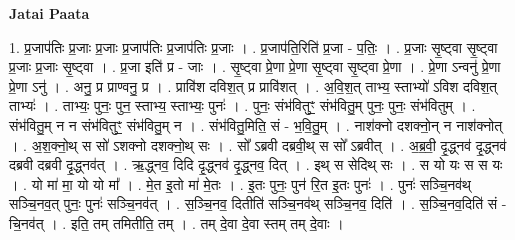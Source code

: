 \documentclass[17pt]{extarticle}
\begin{document}
\textbf{Jatai Paata} \newline

1. प्र॒जाप॑तिः प्र॒जाः प्र॒जाः प्र॒जाप॑तिः प्र॒जाप॑तिः प्र॒जाः । . प्र॒जाप॑ति॒रिति॑ प्र॒जा - प॒तिः॒ । . प्र॒जाः सृ॒ष्ट्वा सृ॒ष्ट्वा प्र॒जाः प्र॒जाः सृ॒ष्ट्वा । . प्र॒जा इति॑ प्र - जाः । . सृ॒ष्ट्वा प्रे॒णा प्रे॒णा सृ॒ष्ट्वा सृ॒ष्ट्वा प्रे॒णा । . प्रे॒णा ऽन्वनु॑ प्रे॒णा प्रे॒णा ऽनु॑ । . अनु॒ प्र प्राण्वनु॒ प्र । . प्रावि॑श दविश॒त् प्र प्रावि॑शत् । . अ॒वि॒श॒त् ताभ्य॒ स्ताभ्यो॑ ऽविश दविश॒त् ताभ्यः॑ । . ताभ्यः॒ पुनः॒ पुन॒ स्ताभ्य॒ स्ताभ्यः॒ पुनः॑ । . पुनः॒ संभ॑वितुꣳ॒॒ संभ॑वितु॒म् पुनः॒ पुनः॒ संभ॑वितुम् । . संभ॑वितु॒म् न न संभ॑वितुꣳ॒॒ संभ॑वितु॒म् न । . संभ॑वितु॒मिति॒ सं - भ॒वि॒तु॒म् । . नाश॑क्नो दशक्नो॒न् न नाश॑क्नोत् । . अ॒श॒क्नो॒थ् स सो॑ ऽशक्नो दशक्नो॒थ् सः । . सो᳚ ऽब्रवी दब्रवी॒थ् स सो᳚ ऽब्रवीत् । . अ॒ब्र॒वी॒ दृ॒द्ध्नव॑ दृ॒द्ध्नव॑ दब्रवी दब्रवी दृ॒द्ध्नव॑त् । . ऋ॒द्ध्नव॒ दिदि दृ॒द्ध्नव॑ दृ॒द्ध्नव॒ दित् । . इथ् स सेदिथ् सः । . स यो यः स स यः । . यो मा॑ मा॒ यो यो मा᳚ । . मे॒त इ॒तो मा॑ मे॒तः । . इ॒तः पुनः॒ पुन॑ रि॒त इ॒तः पुनः॑ । . पुनः॑ सञ्चि॒नव॑थ् सञ्चि॒नव॒त् पुनः॒ पुनः॑ सञ्चि॒नव॑त् । . स॒ञ्चि॒नव॒ दितीति॑ सञ्चि॒नव॑थ् सञ्चि॒नव॒ दिति॑ । . स॒ञ्चि॒नव॒दिति॑ सं - चि॒नव॑त् । . इति॒ तम् तमितीति॒ तम् । . तम् दे॒वा दे॒वा स्तम् तम् दे॒वाः । \newline
\end{document}
